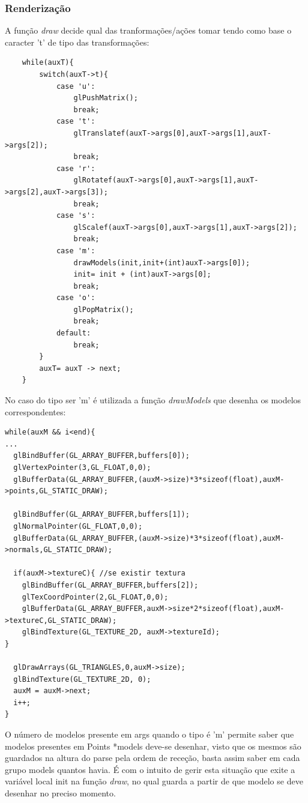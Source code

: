 \documentclass{article}
\begin{document}
\subsubsection{Renderização}
A função \textit{draw} decide qual das tranformações/ações tomar tendo como base o caracter 't' de tipo das transformações:
\begin{verbatim}
    while(auxT){
        switch(auxT->t){
            case 'u':
                glPushMatrix();
                break;
            case 't':
                glTranslatef(auxT->args[0],auxT->args[1],auxT->args[2]);
                break;
            case 'r':
                glRotatef(auxT->args[0],auxT->args[1],auxT->args[2],auxT->args[3]);
                break;
            case 's':
                glScalef(auxT->args[0],auxT->args[1],auxT->args[2]);
                break;
            case 'm':
                drawModels(init,init+(int)auxT->args[0]);
                init= init + (int)auxT->args[0];
                break;
            case 'o':
                glPopMatrix();
                break;
            default:
                break;
        }
        auxT= auxT -> next;
    }
\end{verbatim} 
No caso do tipo ser 'm' é utilizada a função \textit{drawModels} que desenha os modelos correspondentes:
\begin{verbatim}
while(auxM && i<end){
...
  glBindBuffer(GL_ARRAY_BUFFER,buffers[0]);
  glVertexPointer(3,GL_FLOAT,0,0);
  glBufferData(GL_ARRAY_BUFFER,(auxM->size)*3*sizeof(float),auxM->points,GL_STATIC_DRAW);

  glBindBuffer(GL_ARRAY_BUFFER,buffers[1]);
  glNormalPointer(GL_FLOAT,0,0);
  glBufferData(GL_ARRAY_BUFFER,(auxM->size)*3*sizeof(float),auxM->normals,GL_STATIC_DRAW);

  if(auxM->textureC){ //se existir textura
    glBindBuffer(GL_ARRAY_BUFFER,buffers[2]);
    glTexCoordPointer(2,GL_FLOAT,0,0);
    glBufferData(GL_ARRAY_BUFFER,auxM->size*2*sizeof(float),auxM->textureC,GL_STATIC_DRAW);
    glBindTexture(GL_TEXTURE_2D, auxM->textureId);
}

  glDrawArrays(GL_TRIANGLES,0,auxM->size);
  glBindTexture(GL_TEXTURE_2D, 0);
  auxM = auxM->next;
  i++;
}
\end{verbatim}
O número de modelos presente em args quando o tipo é 'm' permite saber que modelos presentes em Points *models deve-se desenhar, visto que os mesmos são guardados na altura do parse pela ordem de receção, basta assim saber em cada grupo models quantos havia. É com o intuito de gerir esta situação que exite a variável local init na função \textit{draw}, no qual guarda a partir de que modelo se deve desenhar no preciso momento.
\end{document}
